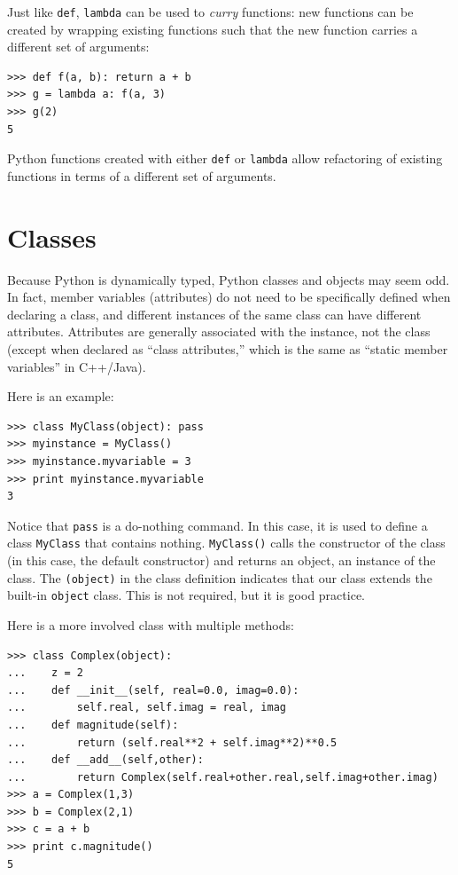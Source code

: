 \documentclass[justified,sixbynine]{tufte-book}
\def\ft{\small\tt}
\theoremstyle{plain}%
\theoremstyle{definition}
\theoremstyle{remark}
\begin{document}
\begin{fullwidth}

Just like {\ft def}, {\ft lambda} can be used to {\it curry} functions: new functions can be created by wrapping existing functions such that the new function carries a different set of arguments:

\begin{lstlisting}
>>> def f(a, b): return a + b
>>> g = lambda a: f(a, 3)
>>> g(2)
5
\end{lstlisting}

Python functions created with either {\ft def} or {\ft lambda} allow refactoring of existing functions in terms of a different set of arguments.

\goodbreak\section{Classes}


Because Python is dynamically typed, Python classes and objects may seem odd. In fact, member variables (attributes) do not need to be specifically defined when declaring a class, and different instances of the same class can have different attributes. Attributes are generally associated with the instance, not the class (except when declared as ``class attributes,'' which is the same as ``static member variables'' in C++/Java).

Here is an example:

\begin{lstlisting}
>>> class MyClass(object): pass
>>> myinstance = MyClass()
>>> myinstance.myvariable = 3
>>> print myinstance.myvariable
3
\end{lstlisting}

Notice that {\ft pass} is a do-nothing command. In this case, it is used to define a class {\ft MyClass} that contains nothing. {\ft MyClass()} calls the constructor of the class (in this case, the default constructor) and returns an object, an instance of the class. The {\ft (object)} in the class definition indicates that our class extends the built-in {\ft object} class. This is not required, but it is good practice.


Here is a more involved class with multiple methods:
\begin{lstlisting}
>>> class Complex(object):
...    z = 2
...    def __init__(self, real=0.0, imag=0.0):
...        self.real, self.imag = real, imag
...    def magnitude(self):
...        return (self.real**2 + self.imag**2)**0.5
...    def __add__(self,other):
...        return Complex(self.real+other.real,self.imag+other.imag)
>>> a = Complex(1,3)
>>> b = Complex(2,1)
>>> c = a + b
>>> print c.magnitude()
5
\end{lstlisting}


\end{fullwidth}
\end{document}

